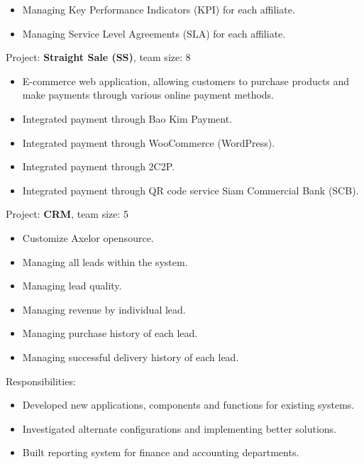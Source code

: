 {\begin{cvitems}
{\begin{itemize}
                \item { Managing Key Performance Indicators (KPI) for each affiliate. }
                \item { Managing Service Level Agreements (SLA) for each affiliate. }
            \end{itemize}
        }
        \item { Project: \textbf{Straight Sale (SS)}, team size: 8 }
        {
            \begin{itemize}
                \item { E-commerce web application, allowing customers to purchase products and make payments through various online payment methods. }
                \item { Integrated payment through Bao Kim Payment. }
                \item { Integrated payment through WooCommerce (WordPress). }
                \item { Integrated payment through 2C2P. }
                \item { Integrated payment through QR code service Siam Commercial Bank (SCB). }
            \end{itemize}
        }
        \item { Project: \textbf{CRM}, team size: 5 }
        {
            \begin{itemize}
                \item { Customize Axelor opensource. }
                \item { Managing all leads within the system. }
                \item { Managing lead quality. }
                \item { Managing revenue by individual lead. }
                \item { Managing purchase history of each lead. }
                \item { Managing successful delivery history of each lead. }
            \end{itemize}
        }
        \item {Responsibilities: }
        {
            \begin{itemize} %
                \item { Developed new applications, components and functions for existing systems. }
                \item { Investigated alternate configurations and implementing better solutions. }
                \item { Built reporting system for finance and accounting departments. }

\end{itemize}}
\end{cvitems}}
